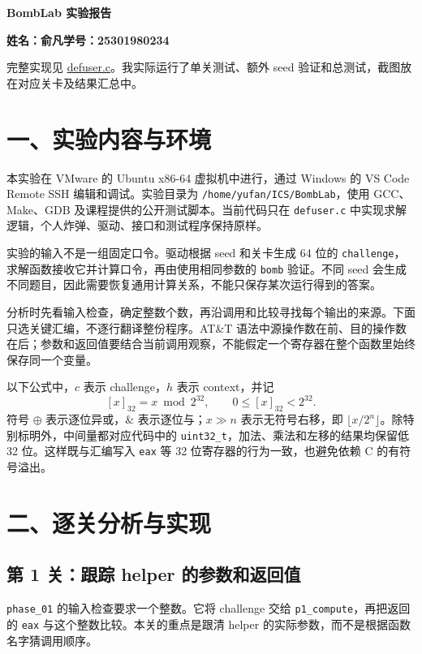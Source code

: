 \documentclass[UTF8,11pt,a4paper,fontset=none]{ctexart}
\newcommand{\uval}[1]{\left[#1\right]_{32}}
\newcommand{\band}{\mathbin{\&}}
\begin{document}
\begin{center}{\LARGE\bfseries BombLab 实验报告}\end{center}


\noindent\textbf{姓名：俞凡\quad 学号：25301980234}\par

完整实现见 \href{run:defuser.c}{defuser.c}。我实际运行了单关测试、额外 seed 验证和总测试，截图放在对应关卡及结果汇总中。

\section*{一、实验内容与环境}


本实验在 VMware 的 Ubuntu x86-64 虚拟机中进行，通过 Windows 的 VS Code Remote SSH 编辑和调试。实验目录为 \texttt{/home/yufan/ICS/BombLab}，使用 GCC、Make、GDB 及课程提供的公开测试脚本。当前代码只在 \texttt{defuser.c} 中实现求解逻辑，个人炸弹、驱动、接口和测试程序保持原样。

实验的输入不是一组固定口令。驱动根据 seed 和关卡生成 64 位的 \texttt{challenge}，求解函数接收它并计算口令，再由使用相同参数的 \texttt{bomb} 验证。不同 seed 会生成不同题目，因此需要恢复通用计算关系，不能只保存某次运行得到的答案。

分析时先看输入检查，确定整数个数，再沿调用和比较寻找每个输出的来源。下面只选关键汇编，不逐行翻译整份程序。AT\&T 语法中源操作数在前、目的操作数在后；参数和返回值要结合当前调用观察，不能假定一个寄存器在整个函数里始终保存同一个变量。

以下公式中，$c$ 表示 challenge，$h$ 表示 context，并记
\[
  \uval{x}=x\bmod 2^{32},\qquad 0\leq \uval{x}<2^{32}.
\]
符号 $\oplus$ 表示逐位异或，$\band$ 表示逐位与；$x\gg n$ 表示无符号右移，即 $\lfloor x/2^n\rfloor$。除特别标明外，中间量都对应代码中的 \texttt{uint32\_t}，加法、乘法和左移的结果均保留低 32 位。这样既与汇编写入 \texttt{eax} 等 32 位寄存器的行为一致，也避免依赖 C 的有符号溢出。

\section*{二、逐关分析与实现}


\Needspace{189pt}\subsection*{第 1 关：跟踪 helper 的参数和返回值}


\texttt{phase\_01} 的输入检查要求一个整数。它将 challenge 交给 \texttt{p1\_compute}，再把返回的 \texttt{eax} 与这个整数比较。本关的重点是跟清 helper 的实际参数，而不是根据函数名字猜调用顺序。
\end{document}
